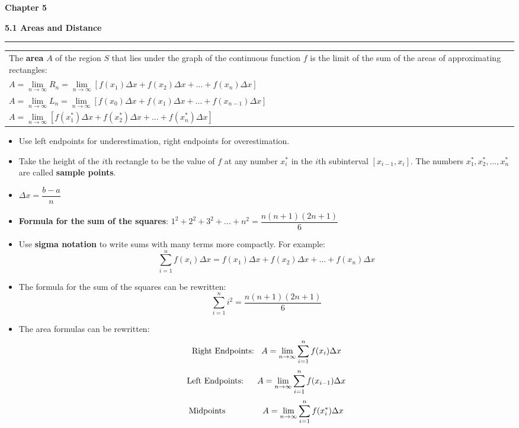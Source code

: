 \documentclass[fleqn]{article}
\begin{document}
\Huge\textbf{Chapter 5}
\vspace{16pt}

\begin{center}
\Large\textbf{5.1 Areas and Distance}

\noindent\hfill\rule{0.3\textwidth}{.4pt}\hfill
\vspace{12pt}

\large
\def\arraystretch{1.3}
{\setlength{\tabcolsep}{16pt}
\begin{tabularx}{.9\textwidth}{|X|}
\hline
	\vspace{1pt}
	The \textbf{area} $A$ of the region $S$ that lies under the graph of the continuous function $f$ is the limit of the sum of the areas of approximating rectangles: \\[10pt]

	$A = \underset{n \to \infty}{\lim} R_n = \underset{n \to \infty}{\lim} [f(x_1) \Delta x + f(x_2) \Delta x + ... + f(x_n) \Delta x]$ \\[10pt]
	$A = \underset{n \to \infty}{\lim} L_n = \underset{n \to \infty}{\lim} [f(x_0) \Delta x + f(x_1) \Delta x + ... + f(x_{n-1}) \Delta x]$ \\[10pt]
	$A = \underset{n \to \infty}{\lim} [f(x_1^*) \Delta x + f(x_2^*) \Delta x + ... + f(x_n^*) \Delta x]$ \\[16pt]
\hline
\end{tabularx}}
\vspace{12pt}

\begin{itemize}
	\item Use left endpoints for underestimation, right endpoints for overestimation. 
	\item Take the height of the $i$th rectangle to be the value of $f$ at any number $x_i^*$ in the $i$th subinterval $[x_{i-1}, x_i]$. The numbers $x_1^*, x_2^*, ... , x_n^*$ are called \textbf{sample points}.
	\item $\Delta x = \dfrac{b-a}{n}$ 
	\item \textbf{Formula for the sum of the squares}: $1^2 + 2^2 +3^2 + ... + n^2 = \dfrac {n(n+1)(2n+1)}{6}$
	\item Use \textbf{sigma notation} to write sums with many terms more compactly. For example:  \[\sum_{i=1}^n f(x_i) \Delta x = f(x_1) \Delta x + f(x_2) \Delta x + ... + f(x_n) \Delta x\]
	\item The formula for the sum of the squares can be rewritten: \[\sum_{i=1}^n i^2 = \dfrac{n(n+1)(2n+1)}{6}\]
	\item The area formulas can be rewritten: 
		\[\text{Right Endpoints: \:\:} A = \underset{n \to \infty}{\lim} \sum_{i=1}^n f(x_i) \Delta x\]
		\[\text{Left Endpoints: \: \hspace{1pt} } A = \underset{n \to \infty}{\lim} \sum_{i=1}^n f(x_{i-1}) \Delta x\]
		\[\text{Midpoints \:\: \hspace{34pt}} A = \underset{n \to \infty}{\lim} \sum_{i=1}^n f(x_i^*) \Delta x\]
\end{itemize}
\end{center}
\end{document}
